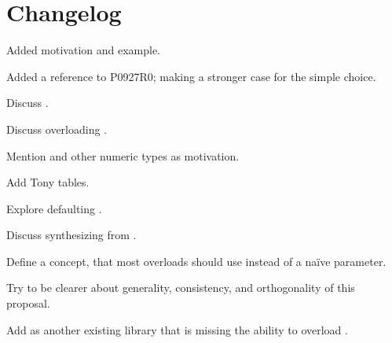 \section{Changelog}
\begin{revision}
  \item Added  motivation and example.
  \item Added a reference to P0927R0; making a stronger case for the simple choice.
\end{revision}

\begin{revision}
  \item Discuss .
  \item Discuss overloading .
  \item Mention  and other numeric types as motivation.
\end{revision}

\begin{revision}
  \item Add Tony tables.
  \item Explore defaulting .
  \item Discuss synthesizing  from .
  \item Define a  concept, that most overloads should use instead of a naïve \bool parameter.
  \item Try to be clearer about generality, consistency, and orthogonality of this proposal.
  \item Add  as another existing library that is missing the ability to overload .
\end{revision}

